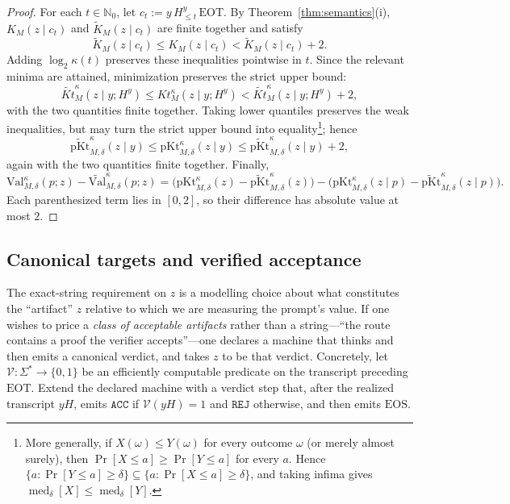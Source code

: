 \documentclass[letterpaper]{article} %
\theoremstyle{definition}
\theoremstyle{remark}
\newcommand{\EOT}{\mathrm{EOT}}
\newcommand{\Val}{\mathrm{Val}}
\newcommand{\EOS}{\mathrm{EOS}}
\newcommand{\ACC}{\texttt{ACC}}
\DeclareMathOperator{\med}{med}
\newcommand{\REJ}{\texttt{REJ}}
\newcommand{\pKt}{\mathrm{pKt}}
\newcommand{\pKtt}{\widetilde{\pKt}}
\begin{document}
\begin{proof}
For each \(t\in\mathbb N_0\), let
\(c_t:=y\,H^y_{\leq t}\,\EOT\). By
Theorem~\ref{thm:semantics}(i), \(K_M(z\mid c_t)\) and
\(\widetilde K_M(z\mid c_t)\) are finite together and satisfy
\[
\widetilde K_M(z\mid c_t)
\leq K_M(z\mid c_t)
< \widetilde K_M(z\mid c_t)+2.
\]
Adding \(\log_2\kappa(t)\) preserves these inequalities pointwise in \(t\).
Since the relevant minima are attained, minimization preserves the strict
upper bound:
\[
\widetilde{Kt}^{\kappa}_M(z\mid y;H^y)
\leq Kt^{\kappa}_M(z\mid y;H^y)
< \widetilde{Kt}^{\kappa}_M(z\mid y;H^y)+2,
\]
with the two quantities finite together. Taking lower quantiles preserves the
weak inequalities, but may turn the strict upper bound into equality\footnote{More generally, if \(X(\omega)\leq Y(\omega)\) for every outcome
\(\omega\) (or merely almost surely), then
\(\Pr[X\leq a]\geq\Pr[Y\leq a]\) for every \(a\). Hence
\(\{a:\Pr[Y\leq a]\geq\delta\}\subseteq
\{a:\Pr[X\leq a]\geq\delta\}\), and taking infima gives
\(\med_\delta[X]\leq\med_\delta[Y]\).}; hence
\[
\pKtt^{\kappa}_{M,\delta}(z\mid y)
\leq \pKt^{\kappa}_{M,\delta}(z\mid y)
\leq \pKtt^{\kappa}_{M,\delta}(z\mid y)+2,
\]
again with the two quantities finite together. Finally,
\[
\Val^\kappa_{M,\delta}(p;z)
-\widetilde{\Val}^\kappa_{M,\delta}(p;z)
=
\bigl(
\pKt^\kappa_{M,\delta}(z)
-\pKtt^\kappa_{M,\delta}(z)
\bigr)
-
\bigl(
\pKt^\kappa_{M,\delta}(z\mid p)
-\pKtt^\kappa_{M,\delta}(z\mid p)
\bigr).
\]
Each parenthesized term lies in \([0,2]\), so their difference has absolute
value at most \(2\).
\end{proof}
\subsection{Canonical targets and verified acceptance}\label{sec:canonical}
The exact-string requirement on $z$ is a modelling choice about what constitutes
the ``artifact'' $z$ relative to which we are measuring the prompt's value. If
one wishes to price a \emph{class of acceptable artifacts} rather than a string---``the
route contains a proof the verifier accepts''---one declares a machine that
thinks and then emits a canonical verdict, and takes $z$ to be that verdict.
Concretely, let
\(\mathcal V:\Sigma^*\to\{0,1\}\) be an efficiently computable predicate on
the transcript preceding \(\EOT\). Extend the declared machine with a verdict
step that, after the realized transcript \(yH\), emits \(\ACC\) if
\(\mathcal V(yH)=1\) and \(\REJ\) otherwise, and then emits \(\EOS\).
\end{document}
